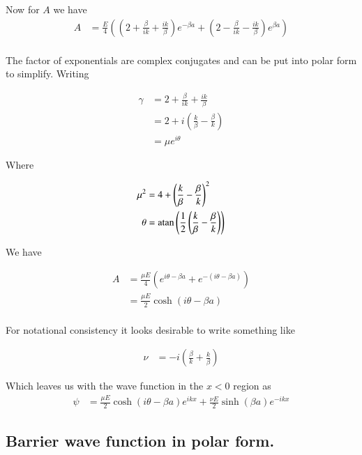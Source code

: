 \documentclass{article}
\DeclareMathOperator{\atan}{atan}
\begin{document}
Now for $A$ we have
\begin{align*}
A &= \frac{E}{4}\left( \left(2 + \frac{\beta}{ik} + \frac{ik}{\beta} \right) e^{ -\beta a} + \left(2 - \frac{\beta}{ik} - \frac{ik}{\beta} \right) e^{ \beta a } \right) \\
\end{align*}

The factor of exponentials are complex conjugates and can be put into polar form to simplify.  Writing

\begin{align*}
\gamma 
&= 2 + \frac{\beta}{ik} + \frac{ik}{\beta} \\
&= 2 + i \left( \frac{k}{\beta} -\frac{\beta}{k} \right) \\
&= \mu e^{i \theta} 
\end{align*}

Where 

\begin{align*}
\mu^2 &= 4 + \left( \frac{k}{\beta} -\frac{\beta}{k} \right)^2 \\
\theta &= \atan\left( \inv{2} \left(\frac{k}{\beta} - \frac{\beta}{k} \right) \right)
\end{align*}

We have

\begin{align*}
A 
&= \frac{\mu E}{4}\left( e^{ i\theta -\beta a} + e^{ -(i \theta - \beta a) } \right) \\
&= \frac{\mu E}{2}\cosh\left( i\theta -\beta a \right) \\
\end{align*}

For notational consistency it looks desirable to write something like

\begin{align*}
\nu &= -i \left(\frac{\beta}{k} + \frac{k}{\beta} \right) 
\end{align*}

Which leaves us with the wave function in the $x<0$ region as
\begin{align}
\psi &=
\frac{\mu E}{2}\cosh\left( i\theta -\beta a \right) e^{ i k x }
+\frac{\nu E}{2}\sinh\left( \beta a \right) e^{ -i k x }
\end{align}

\subsection{ Barrier wave function in polar form. }
\end{document}
